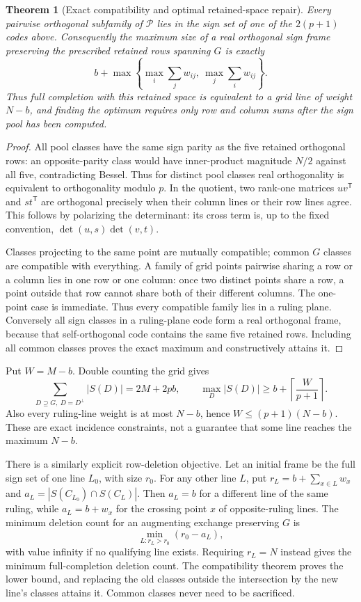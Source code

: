 \documentclass[11pt]{article}
\newtheorem{theorem}{Theorem}[section]
\begin{document}
\begin{theorem}[Exact compatibility and optimal retained-space repair]
Every pairwise orthogonal subfamily of $\mathcal P$ lies in the
sign set of one of the $2(p+1)$ codes above. Consequently the maximum
size of a real orthogonal sign frame preserving the prescribed
retained rows spanning $G$ is exactly
\[
 \boxed{b+\max\left\{\max_i\sum_jw_{ij},\ \max_j\sum_iw_{ij}\right\}.}
\]
Thus full completion with this retained space is equivalent to a
grid line of weight $N-b$, and finding the optimum requires only
row and column sums after the sign pool has been computed.
\end{theorem}
\begin{proof}
All pool classes have the same sign parity as the five retained
orthogonal rows: an opposite-parity class would have inner-product
magnitude $N/2$ against all five, contradicting Bessel. Thus for
distinct pool classes real orthogonality is equivalent to orthogonality
modulo $p$. In the quotient, two rank-one matrices $uv^{\mathsf T}$
and $st^{\mathsf T}$ are orthogonal precisely when their column
lines or their row lines agree. This follows by polarizing the
determinant: its cross term is, up to the fixed convention,
$\det(u,s)\det(v,t)$.

Classes projecting to the same point are mutually compatible;
common $G$ classes are compatible with everything. A family of grid
points pairwise sharing a row or a column lies in one row or one
column: once two distinct points share a row, a point outside that
row cannot share both of their different columns. The one-point
case is immediate. Thus every compatible family lies in a ruling
plane. Conversely all sign classes in a ruling-plane code form
a real orthogonal frame, because that self-orthogonal code contains
the same five retained rows. Including all common classes proves
the exact maximum and constructively attains it.
\end{proof}

Put $W=M-b$. Double counting the grid gives
\[
 \sum_{D\supseteq G,\ D=D^\perp}|S(D)|=2M+2pb,
 \qquad
 \max_D|S(D)|\ge b+\left\lceil\frac{W}{p+1}\right\rceil.
\]
Also every ruling-line weight is at most $N-b$, hence
$W\le(p+1)(N-b)$. These are exact incidence constraints, not a
guarantee that some line reaches the maximum $N-b$.

There is a similarly explicit row-deletion objective. Let an initial
frame be the full sign set of one line $L_0$, with size $r_0$.
For any other line $L$, put $r_L=b+\sum_{x\in L}w_x$ and
$a_L=|S(C_{L_0})\cap S(C_L)|$. Then $a_L=b$ for a different line
of the same ruling, while $a_L=b+w_x$ for the crossing point $x$
of opposite-ruling lines. The minimum deletion count for an
augmenting exchange preserving $G$ is
\[
 \min_{L:r_L>r_0}(r_0-a_L),
\]
with value infinity if no qualifying line exists. Requiring
$r_L=N$ instead gives the minimum full-completion deletion count.
The compatibility theorem proves the lower bound, and replacing
the old classes outside the intersection by the new line's classes
attains it. Common classes never need to be sacrificed.
\end{document}
